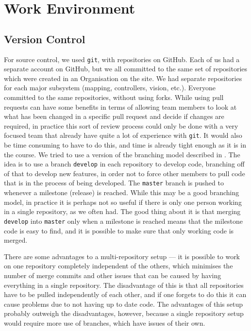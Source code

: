 \section{Work Environment}
\subsection{Version Control}
For source control, we used \texttt{git}, with repositories on GitHub. Each of
us had a separate account on GitHub, but we all committed to the same set of
repositories which were created in an Organisation on the site. We had separate
repositories for each major subsystem (mapping, controllers, vision, etc.).
Everyone committed to the same repositories, without using forks. While using
pull requests can have some benefits in terms of allowing team members to look
at what has been changed in a specific pull request and decide if changes are
required, in practice this sort of review process could only be done with a very
focused team that already have quite a lot of experience with \texttt{git}. It
would also be time consuming to have to do this, and time is already tight
enough as it is in the course. We tried to use a version of the branching model
described in \cite{nviebranch}. The idea is to use a branch \texttt{develop} in
each repository to develop code, branching off of that to develop new features,
in order not to force other members to pull code that is in the process of being
developed. The \texttt{master} branch is pushed to whenever a milestone
(release) is reached. While this may be a good branching model, in practice it
is perhaps not so useful if there is only one person working in a single
repository, as we often had. The good thing about it is that merging
\texttt{develop} into \texttt{master} only when a milestone is reached means
that the milestone code is easy to find, and it is possible to make sure that
only working code is merged.

There are some advantages to a multi-repository setup --- it is possible to work
on one repository completely independent of the others, which minimises the
number of merge commits and other issues that can be caused by having everything
in a single repository. The disadvantage of this is that all repositories have
to be pulled independently of each other, and if one forgets to do this it can
cause problems due to not having up to date code. The advantages of this setup
probably outweigh the disadvantages, however, because a single repository setup
would require more use of branches, which have issues of their own.

